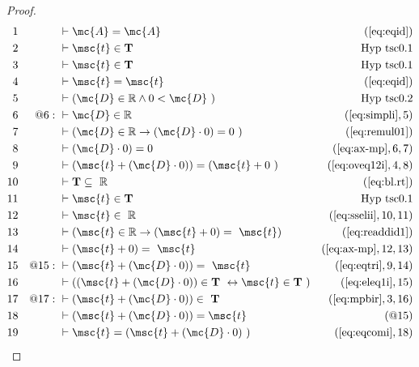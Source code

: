 \begin{proof}
\begin{align}
  1 &&  & \vdash \mc{A} = \mc{A}&(\mbox{\ref{eq:eqid}})\notag
  \\ 2 &&  & \vdash \msc{t} \in \mathbf{T}&\text{Hyp~tsc0.1}\notag%
  \\ 3 &&  & \vdash \msc{t} \in \mathbf{T}&\text{Hyp~tsc0.1}\notag%
  \\ 4 &&  & \vdash \msc{t} = \msc{t}&(\mbox{\ref{eq:eqid}})\notag
  \\ 5 &&  & \vdash ( \mc{D} \in \mathbb{R} \wedge 0 < \mc{D}
     ~)&\text{Hyp~tsc0.2}\notag%
  \\ 6 && @6:\  & \vdash \mc{D} \in \mathbb{R}&(\mbox{\ref{eq:simpli}},5)\notag
  \\ 7 &&  & \vdash ( \mc{D} \in \mathbb{R} \rightarrow ( \mc{D} \cdot 0 ) = 0
     ~)&(\mbox{\ref{eq:remul01}})\notag
  \\ 8 &&  & \vdash ( \mc{D} \cdot 0 ) = 0&(\mbox{\ref{eq:ax-mp}},6,7)\notag
  \\ 9 &&  & \vdash ( \msc{t} + ( \mc{D} \cdot 0 ) ) = ( \msc{t} + 0
     ~)&(\mbox{\ref{eq:oveq12i}},4,8)\notag
  \\ 10 &&  & \vdash \mathbf{T} \subseteq
     ~\mathbb{R}&(\mbox{\ref{eq:bl.rt}})\notag
  \\ 11 &&  & \vdash \msc{t} \in \mathbf{T}&\text{Hyp~tsc0.1}\notag%
  \\ 12 &&  & \vdash \msc{t} \in
     ~\mathbb{R}&(\mbox{\ref{eq:sselii}},10,11)\notag
  \\ 13 &&  & \vdash ( \msc{t} \in \mathbb{R} \rightarrow ( \msc{t} + 0 ) =
     ~\msc{t} )&(\mbox{\ref{eq:readdid1}})\notag
  \\ 14 &&  & \vdash ( \msc{t} + 0 ) =
     ~\msc{t}&(\mbox{\ref{eq:ax-mp}},12,13)\notag
  \\ 15 && @15:\  & \vdash ( \msc{t} + ( \mc{D} \cdot 0 ) ) =
     ~\msc{t}&(\mbox{\ref{eq:eqtri}},9,14)\notag
  \\ 16 &&  & \vdash ( ( \msc{t} + ( \mc{D} \cdot 0 ) ) \in \mathbf{T}
     ~\leftrightarrow \msc{t} \in \mathbf{T}
     ~)&(\mbox{\ref{eq:eleq1i}},15)\notag
  \\ 17 && @17:\  & \vdash ( \msc{t} + ( \mc{D} \cdot 0 ) ) \in
     ~\mathbf{T}&(\mbox{\ref{eq:mpbir}},3,16)\notag
  \\ 18 &&  & \vdash ( \msc{t} + ( \mc{D} \cdot 0 ) ) = \msc{t}&(@15)\notag
  \\ 19 &&  & \vdash \msc{t} = ( \msc{t} + ( \mc{D} \cdot 0 )
     ~)&(\mbox{\ref{eq:eqcomi}},18)\notag

\end{align}
\end{proof}
